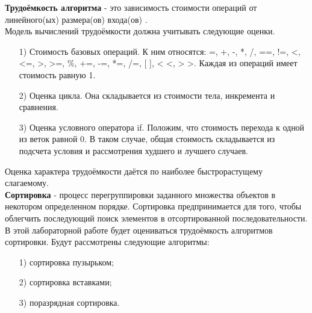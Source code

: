 \textbf{Трудоёмкость алгоритма} - это зависимость стоимости операций от линейного(ых) размера(ов) входа(ов) \cite{labor_int}.\\

Модель вычислений трудоёмкости должна учитывать следующие оценки.
\begin{itemize}
	\item[1)] Стоимость базовых операций. К ним относятся: =, +, -, *, /, ==, !=, <, <=, >, >=, \%, +=, -=, *=, /=, [ ], < <, > >. Каждая из операций имеет стоимость равную 1.
	\item[2)] Оценка цикла. Она складывается из стоимости тела, инкремента и сравнения. 
	\item[3)] Оценка условного оператора if. Положим, что стоимость перехода к одной из веток равной 0. В таком случае, общая стоимость складывается из подсчета условия и рассмотрения худшего и лучшего случаев.
\end{itemize}

Оценка характера трудоёмкости даётся по наиболее быстрорастущему слагаемому.\\

\textbf{Сортировка} - процесс перегруппировки заданного множества объектов в некотором определенном порядке. Сортировка предпринимается для того, чтобы облегчить последующий поиск элементов в отсортированной последовательности.\\

В этой лабораторной работе будет оцениваться трудоёмкость алгоритмов сортировки.
Будут рассмотрены следующие алгоритмы:
\begin{itemize}
	\item[1)] сортировка пузырьком;
	\item[2)] сортировка вставками;
	\item[3)] поразрядная сортировка.
\end{itemize}